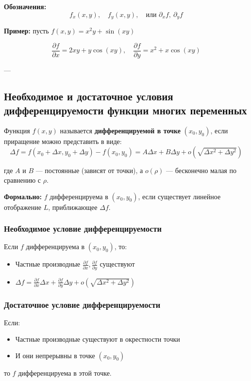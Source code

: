\textbf{Обозначения:}
\[
f_x(x, y), \quad f_y(x, y), \quad \text{или } \partial_x f, \ \partial_y f
\]

\textbf{Пример:} пусть $f(x, y) = x^2 y + \sin(xy)$

\[
\frac{\partial f}{\partial x} = 2x y + y \cos(xy), \quad
\frac{\partial f}{\partial y} = x^2 + x \cos(xy)
\]

---

\subsection*{Необходимое и достаточное условия дифференцируемости функции многих переменных}

Функция $f(x, y)$ называется \textbf{дифференцируемой в точке} $(x_0, y_0)$, если приращение можно представить в виде:
\[
\Delta f = f(x_0 + \Delta x, y_0 + \Delta y) - f(x_0, y_0) = A \Delta x + B \Delta y + o(\sqrt{\Delta x^2 + \Delta y^2})
\]

где $A$ и $B$ — постоянные (зависят от точки), а $o(\rho)$ — бесконечно малая по сравнению с $\rho$.

\textbf{Формально:} $f$ дифференцируема в $(x_0, y_0)$, если существует линейное отображение $L$, приближающее $\Delta f$.

\subsubsection*{Необходимое условие дифференцируемости}

Если $f$ дифференцируема в $(x_0, y_0)$, то:
\begin{itemize}
  \item Частные производные $\frac{\partial f}{\partial x}, \frac{\partial f}{\partial y}$ существуют
  \item $\Delta f = \frac{\partial f}{\partial x} \Delta x + \frac{\partial f}{\partial y} \Delta y + o(\sqrt{\Delta x^2 + \Delta y^2})$
\end{itemize}

\subsubsection*{Достаточное условие дифференцируемости}

Если:
\begin{itemize}
  \item Частные производные существуют в окрестности точки
  \item И они непрерывны в точке $(x_0, y_0)$
\end{itemize}
то $f$ дифференцируема в этой точке.

